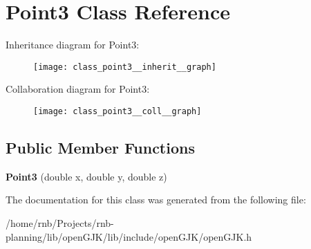 \hypertarget{class_point3}{}\section{Point3 Class Reference}
\label{class_point3}


Inheritance diagram for Point3\+:\nopagebreak
\begin{figure}[H]
\begin{center}
\leavevmode
\texttt{[image: class\_point3\_\_inherit\_\_graph]}
\end{center}
\end{figure}


Collaboration diagram for Point3\+:\nopagebreak
\begin{figure}[H]
\begin{center}
\leavevmode
\texttt{[image: class\_point3\_\_coll\_\_graph]}
\end{center}
\end{figure}
\subsection*{Public Member Functions}
\begin{DoxyCompactItemize}
\item 
\mbox{\label{class_point3_a2d456f96475506f6eb9053d5c2b1a910}} 
{\bfseries Point3} (double x, double y, double z)
\end{DoxyCompactItemize}


The documentation for this class was generated from the following file\+:\begin{DoxyCompactItemize}
\item 
/home/rnb/\+Projects/rnb-\/planning/lib/open\+G\+J\+K/lib/include/open\+G\+J\+K/open\+G\+J\+K.\+h\end{DoxyCompactItemize}
